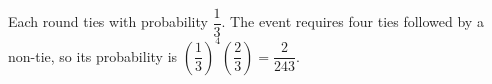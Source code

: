 Each round ties with probability $\dfrac{1}{3}$. The event requires four ties followed by a non-tie, so its probability is $(\dfrac{1}{3})^4(\dfrac{2}{3})=\boxed{\dfrac{2}{243}}$.
